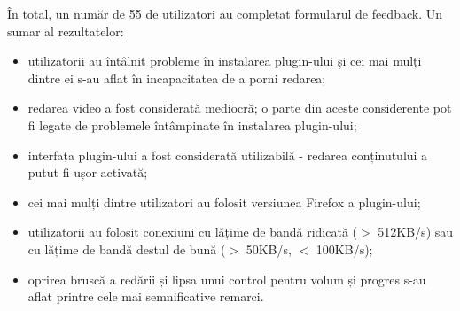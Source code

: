 În total, un număr de 55 de utilizatori au completat formularul de feedback.
Un sumar al rezultatelor:
\begin{itemize}
  \item utilizatorii au întâlnit probleme în instalarea plugin-ului și cei mai
  mulți dintre ei s-au aflat în incapacitatea de a porni redarea;
  \item redarea video a fost considerată mediocră; o parte din aceste considerente
  pot fi legate de problemele întâmpinate în instalarea plugin-ului;
  \item interfața plugin-ului a fost considerată utilizabilă - redarea conținutului
  a putut fi ușor activată;
  \item cei mai mulți dintre utilizatori au folosit versiunea Firefox a plugin-ului;
  \item utilizatorii au folosit conexiuni cu lățime de bandă ridicată ($>$ 512KB/s)
  sau cu lățime de bandă destul de bună ($>$ 50KB/s, $<$ 100KB/s);
  \item oprirea bruscă a redării și lipsa unui control pentru volum și progres s-au
  aflat printre cele mai semnificative remarci.
\end{itemize}


